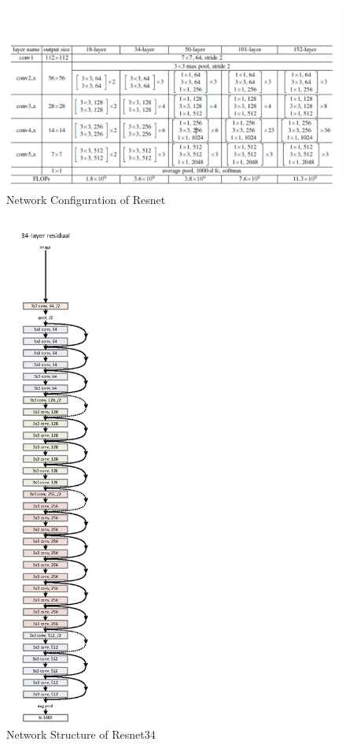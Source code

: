 \documentclass{article}
\begin{document}
\begin{figure}[!htb]
	\centering\includegraphics[width=1.0\textwidth]{fig/resnet.png}
	\caption{Network Configuration of  Resnet\protect\footnotemark}\label{fig:resnet}
\end{figure}


\begin{figure}[!htb]
	\centering\includegraphics[width=0.3\textwidth]{fig/res34.png}
	\caption{Network Structure of  Resnet34\protect\footnotemark}\label{fig:res34}
\end{figure}
\end{document}
